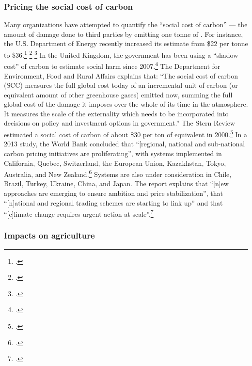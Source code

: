 	\subsubsection{Pricing the social cost of carbon}
	\label{sec:PricingSocialCost}



Many organizations have attempted to quantify the ``social cost of carbon'' --- the amount of damage done to third parties by emitting one tonne of .
For instance, the U.S. Department of Energy recently increased its estimate from \$22 per tonne to \$36.\footcite[][]{DOE22to36} \footcite[][]{WHStrengthened} \footcite[See also: ][]{NewSocialCostEffort}
In the United Kingdom, the government has been using a ``shadow cost'' of carbon to estimate social harm since 2007.\footcite[][]{DEFRAShadowCost}
The Department for Environment, Food and Rural Affairs explains that: ``The social cost of carbon (SCC) measures the full global cost today of an incremental unit of carbon (or equivalent amount of other greenhouse gases) emitted now, summing the full global cost of the damage it imposes over the whole of its time in the atmosphere. It measures the scale of the externality which needs to be incorporated into decisions on policy and investment options in government.''
The Stern Review estimated a social cost of carbon of about \$30 per ton of  equivalent in 2000.\footcite[][]{Stern2007}
In a 2013 study, the World Bank concluded that ``[regional, national and sub-national carbon pricing initiatives are proliferating'', with systems implemented in California, Quebec, Switzerland, the European Union, Kazakhstan, Tokyo, Australia, and New Zealand.\footcite[][p. 11]{WorldBankCarbonPricing}
Systems are also under consideration in Chile, Brazil, Turkey, Ukraine, China, and Japan.
The report explains that ``[n]ew approaches are emerging to ensure ambition and price stabilization'', that ``[n]ational and regional trading schemes are starting to link up'' and that ``[c]limate change requires urgent action at scale''.\footcite[][p. 12--13]{WorldBankCarbonPricing}



	\subsubsection{Impacts on agriculture}



